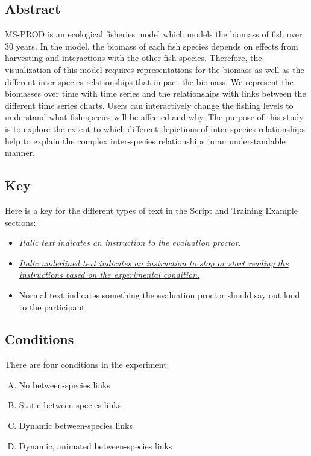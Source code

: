{\setlength{\parskip}{1em} {\setlength{\parindent}{0cm}
{\singlespacing

\subsection{Abstract}

MS-PROD is an ecological fisheries model which models the biomass of fish over 30 years.  In the model, the biomass of each fish species depends on effects from harvesting and interactions with the other fish species.  Therefore, the visualization of this model requires representations for the biomass as well as the different inter-species relationships that impact the biomass.  We represent the biomasses over time with time series and the relationships with links between the different time series charts.  Users can interactively change the fishing levels to understand what fish species will be affected and why.  The purpose of this study is to explore the extent to which different depictions of inter-species relationships help to explain the complex inter-species relationships in an understandable manner.

\subsection{Key}

Here is a key for the different types of text in the Script and Training Example sections:

\begin{itemize}
\item \textit{Italic text indicates an instruction to the evaluation proctor.}
\item \textit{\underline{Italic underlined text indicates an instruction to stop or start reading the} \\ \underline{instructions based on the experimental condition.}}
\item Normal text indicates something the evaluation proctor should say out loud to the participant. 
\end{itemize}

\subsection{Conditions}

There are four conditions in the experiment:

\begin{enumerate}[(A)]
\item No between-species links
\item Static between-species links
\item Dynamic between-species links
\item Dynamic, animated between-species links
\end{enumerate}

}}}
